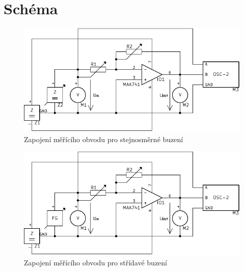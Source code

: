 \section{Schéma}
  \begin{figure}[H]
    \centering
    \includegraphics[width=17cm]{../img/mer2.pdf}
    \caption{Zapojení měřícího obvodu pro stejnosměrné buzení}
    \label{sch:2}
  \end{figure}
  
  \begin{figure}[H]
    \centering
    \includegraphics[width=17cm]{../img/mer.pdf}
    \caption{Zapojení měřícího obvodu pro střídavé buzení}
    \label{sch:2}
  \end{figure}
